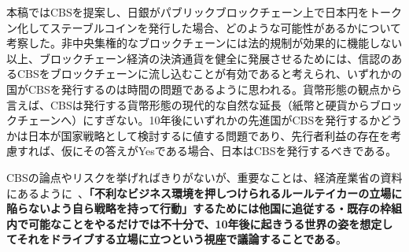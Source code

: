 \documentclass[dvipdfmx,a4paper]{jsarticle}
\begin{document}
本稿ではCBSを提案し、日銀がパブリックブロックチェーン上で日本円をトークン化してステーブルコインを発行した場合、どのような可能性があるかについて考察した。非中央集権的なブロックチェーンには法的規制が効果的に機能しない以上、ブロックチェーン経済の決済通貨を健全に発展させるためには、信認のあるCBSをブロックチェーンに流し込むことが有効であると考えられ、いずれかの国がCBSを発行するのは時間の問題であるように思われる。貨幣形態の観点から言えば、CBSは発行する貨幣形態の現代的な自然な延長（紙幣と硬貨からブロックチェーンへ）にすぎない。10年後にいずれかの先進国がCBSを発行するかどうかは日本が国家戦略として検討するに値する問題であり、先行者利益の存在を考慮すれば、仮にその答えがYesである場合、日本はCBSを発行するべきである。

CBSの論点やリスクを挙げればきりがないが、重要なことは、経済産業省の資料にあるように~\cite{meti}、\textbf{「不利なビジネス環境を押しつけられるルールテイカーの立場に陥らないよう自ら戦略を持って行動」するためには他国に追従する・既存の枠組内で可能なことをやるだけでは不十分で、10年後に起きうる世界の姿を想定してそれをドライブする立場に立つという視座で議論することである}。



\end{document}
